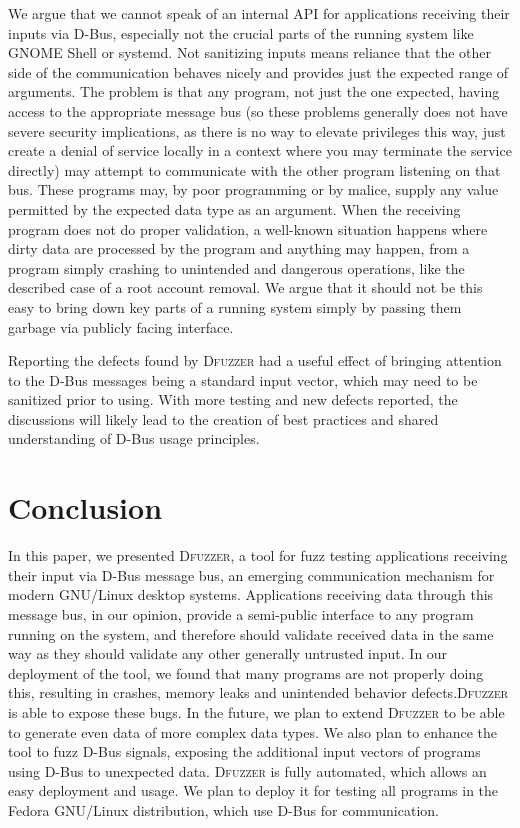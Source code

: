 \documentclass[conference]{IEEEtran}
\begin{document}
We argue that we cannot speak of an internal API for applications receiving
their inputs via D-Bus, especially not the crucial parts of the running system
like GNOME Shell or systemd. Not sanitizing inputs means reliance that the
other side of the communication behaves nicely and provides just the expected
range of arguments. The problem is that any program, not just the one expected,
having access to the appropriate message bus (so these problems generally does
not have severe security implications, as there is no way to elevate privileges
this way, just create a denial of service locally in a context where you may
terminate the service directly) may attempt to communicate with the other
program listening on that bus.
These programs may, by poor programming or by malice, supply any value
permitted by the expected data type as an argument.  When the receiving program
does not do proper validation, a well-known situation happens where dirty data
are processed by the program and anything may happen, from a program simply
crashing to unintended and dangerous operations, like the described case of a
root account removal. We argue that it should not be this easy to bring down
key parts of a running system simply by passing them garbage via publicly
facing interface.


Reporting the defects found by \textsc{Dfuzzer} had a useful effect of bringing
attention to the D-Bus messages being a standard input vector, which may need to
be sanitized prior to using. With more testing and new defects reported, the
discussions will likely lead to the creation of best practices and shared
understanding of D-Bus usage principles.


\section{Conclusion}
In this paper, we presented \textsc{Dfuzzer}, a tool for fuzz testing
applications receiving their input via D-Bus message bus, an emerging
communication mechanism for modern GNU/Linux desktop systems. Applications
receiving data through this message bus, in our opinion, provide a semi-public
interface to any program running on the system, and therefore should validate
received data in the same way as they should validate any other generally
untrusted input. In our deployment of the tool, we found that many programs are
not properly doing this, resulting in crashes, memory leaks and unintended
behavior defects.\newpage\textsc{Dfuzzer} is able to expose these bugs.  In the
future, we plan to extend \textsc{Dfuzzer} to be able to generate even data of
more complex data types. We also plan to enhance the tool to fuzz D-Bus
signals, exposing the additional input vectors of programs using D-Bus to
unexpected data.  \textsc{Dfuzzer} is fully automated, which allows an easy
deployment and usage.  We plan to deploy it for testing all programs in the
Fedora GNU/Linux distribution, which use D-Bus for communication.
\end{document}
